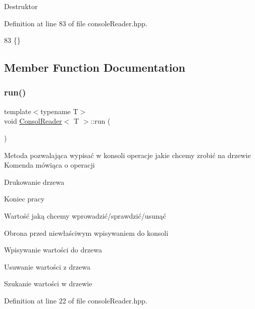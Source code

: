 Destruktor 

Definition at line 83 of file console\+Reader.\+hpp.


\begin{DoxyCode}
83 \{\}
\end{DoxyCode}


\subsection{Member Function Documentation}
\mbox{\label{classConsolReader_a5904bd97fa0b2ee76622b88d5cd17122}} 
\subsubsection{\texorpdfstring{run()}{run()}}
{\footnotesize\ttfamily template$<$typename T$>$ \\
void \hyperlink{classConsolReader}{Consol\+Reader}$<$ T $>$\+::run (\begin{DoxyParamCaption}{ }\end{DoxyParamCaption})\hspace{0.3cm}{\ttfamily [inline]}}

Metoda pozwalająca wypisać w konsoli operacje jakie chcemy zrobić na drzewie Komenda mówiąca o operacji

Drukowanie drzewa

Koniec pracy

Wartość jaką chcemy wprowadzić/sprawdzić/usunąć

Obrona przed niewłaściwym wpisywaniem do konsoli

Wpisywanie wartości do drzewa

Usuwanie wartości z drzewa

Szukanie wartości w drzewie 

Definition at line 22 of file console\+Reader.\+hpp.


